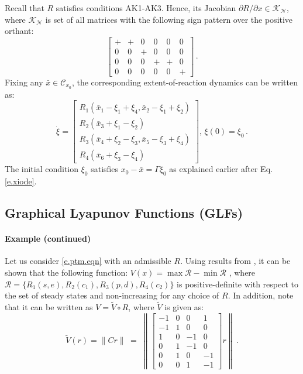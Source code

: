 \documentclass[onefignum,onetabnum]{siamonline220329}
\newcommand\bx{{\bar x}}
\newcommand{\tV}{{\widetilde{V}}}
\newcommand{\R}{{\rm \bf R}}
\newcommand{\Ns}{{\mathscr N}}
\newcommand{\Cs}{\mathscr C}
\def\infty{}%
\begin{document}
Recall that $R$ satisfies conditions AK1-AK3. Hence, its Jacobian $\partial{R}/{\partial x}\in\mathscr K_\Ns$, where $\mathcal K_\Ns$ is set of all matrices with the following sign pattern over the positive orthant:
\[
\begin{bmatrix}  + & + & 0 & 0 & 0 &0 \\ 0 & 0 & + & 0 & 0 & 0 \\ 0  & 0 & 0 & + & + & 0 \\ 0 & 0 & 0 & 0 & 0 &+ \end{bmatrix}
\,.
\]
Fixing any $\bx \in \Cs_{x_0}$, the corresponding extent-of-reaction dynamics can be written as:
\[
\dot\xi = \left[
\begin{array}{l} R_1(\bx_1-\xi_1+\xi_4,\bx_2-\xi_1+\xi_2)\\ R_2(\bx_3+\xi_1-\xi_2) \\ R_3(\bx_4+\xi_2-\xi_3,\bx_5-\xi_3+\xi_4)\\R_4(\bx_6+\xi_3-\xi_4)  
\end{array}
\right], \, \xi(0)=\xi_0 \,.
\]
The initial condition $\xi_0$ satisfies $x_0-\bx=\Gamma \xi_0$ as explained earlier after Eq. \eqref{e.xiode}.%
 
\subsection{Graphical Lyapunov Functions (GLFs)}
 
\paragraph{Example (continued)}

Let us consider \eqref{e.ptm.eqn} with an admissible $R$. Using results from \cite{MA_cdc14,PWLRj,MA_LEARN}, it can be shown that the following function: $V(x)=\max\mathcal R-\min\mathcal R$ \cite{MA_LEARN}, where $\mathcal R=\{R_1(s,e),R_2(c_1),R_3(p,d),R_4(c_2)\}$ is positive-definite with respect to the set of steady states and non-increasing for any choice of $R$.  In addition, note that it can be written as $V=\tV \circ R$, where $\tV$ is given as:
 \begin{equation}
 \label{e.tV_ptm}%
 \tV(r)=\| C r \|_\infty \;=\;
 \left\| \left[ 
 \begin{array}{rrrr}
 -1 & 0 & 0 & 1\\ -1 & 1 & 0 & 0\\ 1 & 0 & -1 & 0\\ 0 & 1 & -1 & 0\\ 0 & 1 & 0 & -1\\ 0 & 0 & 1 & -1 
 \end{array}
 \right] 
 r \right\|_\infty
 \,.
 \end{equation}
 
\end{document}
